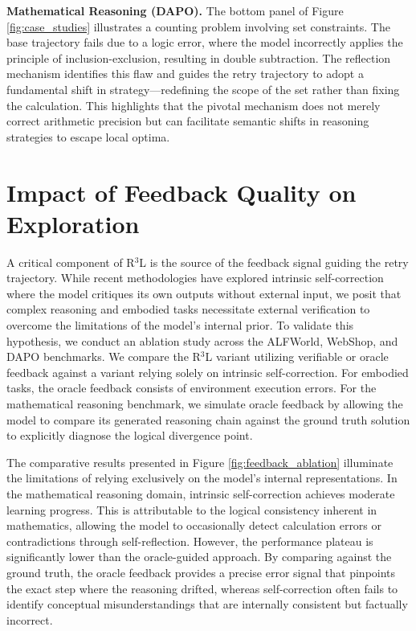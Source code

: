 \documentclass[11pt]{article}
\begin{document}
\textbf{Mathematical Reasoning (DAPO).} The bottom panel of Figure \ref{fig:case_studies} illustrates a counting problem involving set constraints. The base trajectory fails due to a logic error, where the model incorrectly applies the principle of inclusion-exclusion, resulting in double subtraction. The reflection mechanism identifies this flaw and guides the retry trajectory to adopt a fundamental shift in strategy—redefining the scope of the set rather than fixing the calculation. This highlights that the pivotal mechanism does not merely correct arithmetic precision but can facilitate semantic shifts in reasoning strategies to escape local optima.

% 

\section{Impact of Feedback Quality on Exploration}
\label{sec:feedback_quality}

A critical component of R$^3$L is the source of the feedback signal guiding the retry trajectory. While recent methodologies have explored intrinsic self-correction where the model critiques its own outputs without external input, we posit that complex reasoning and embodied tasks necessitate external verification to overcome the limitations of the model's internal prior. To validate this hypothesis, we conduct an ablation study across the ALFWorld, WebShop, and DAPO benchmarks. We compare the R$^3$L variant utilizing verifiable or oracle feedback against a variant relying solely on intrinsic self-correction. For embodied tasks, the oracle feedback consists of environment execution errors. For the mathematical reasoning benchmark, we simulate oracle feedback by allowing the model to compare its generated reasoning chain against the ground truth solution to explicitly diagnose the logical divergence point.

% 

The comparative results presented in Figure \ref{fig:feedback_ablation} illuminate the limitations of relying exclusively on the model's internal representations. In the mathematical reasoning domain, intrinsic self-correction achieves moderate learning progress. This is attributable to the logical consistency inherent in mathematics, allowing the model to occasionally detect calculation errors or contradictions through self-reflection. However, the performance plateau is significantly lower than the oracle-guided approach. By comparing against the ground truth, the oracle feedback provides a precise error signal that pinpoints the exact step where the reasoning drifted, whereas self-correction often fails to identify conceptual misunderstandings that are internally consistent but factually incorrect.
\end{document}
